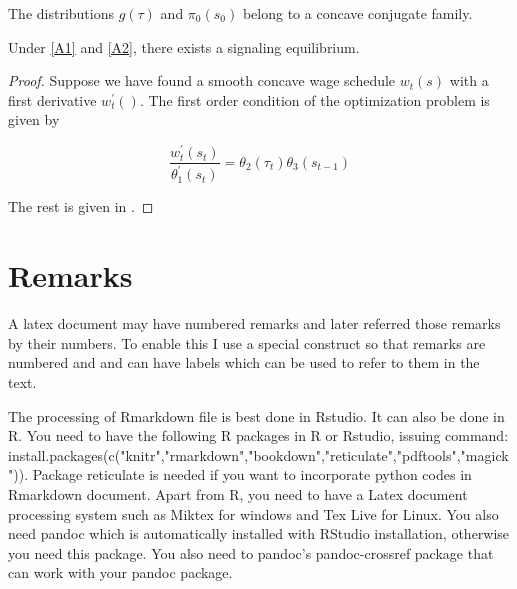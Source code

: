 \documentclass[12pt,svgnames]{article}
\begin{document}
\begin{assumption}
\label{A2}The distributions $g\left( \tau \right)$ and $\pi _{0}\left( s_{0}\right)$ belong to a concave conjugate family.
\end{assumption}

\begin{theorem}
Under \autoref{A1} and \autoref{A2}, there exists a signaling equilibrium.
\end{theorem}

\begin{proof}
Suppose we have found a smooth concave wage schedule $w_{t}\left( s\right)$
with a first derivative $w_{t}^{\prime }\left( {}\right)$. The first order
condition of the optimization problem is given by 

\begin{equation}
 \frac{w_{t}^{\prime }\left( s_{t}\right) }{\theta _{1}^{\prime }\left( s_{t}\right) }=
 \theta _{2}\left( \tau _{t}\right) \theta _{3}\left( s_{t-1}\right) \label{eq10}
\end{equation}

The rest is given in \cite{Raut_2017a}.

\end{proof}

\section{Remarks} \label{sec8}

A latex document may have numbered  remarks and later referred those remarks by their numbers.  To enable this I use a special construct so that remarks are numbered and and can have labels which can be used to refer to them in the text.


\begin{remark}
The processing of Rmarkdown file is best done in Rstudio. It can also be done in R. You need to have the following R packages in R or Rstudio, issuing command: install.packages(c("knitr","rmarkdown","bookdown","reticulate","pdftools","magick")). Package reticulate is needed if you want to incorporate python codes in Rmarkdown document. Apart from R, you need to have a Latex document processing system such as Miktex for windows and Tex Live for Linux.  You also need pandoc which is automatically installed with RStudio installation, otherwise you need this package. You also need to pandoc's pandoc-crossref package that can work with your pandoc package.  
\end{remark}
\end{document}

